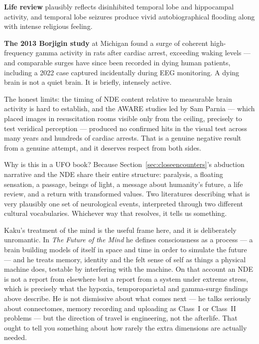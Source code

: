 \textbf{Life review} plausibly reflects disinhibited temporal lobe and hippocampal activity, and
temporal lobe seizures produce vivid autobiographical flooding along with intense religious
feeling.

\textbf{The 2013 Borjigin study} at Michigan found a surge of coherent high-frequency gamma
activity in rats after cardiac arrest, exceeding waking levels --- and comparable surges have
since been recorded in dying human patients, including a 2022 case captured incidentally during
EEG monitoring. A dying brain is not a quiet brain. It is briefly, intensely active.

The honest limits: the timing of NDE content relative to measurable brain activity is hard to
establish, and the AWARE studies led by Sam Parnia --- which placed images in resuscitation rooms
visible only from the ceiling, precisely to test veridical perception --- produced no confirmed
hits in the visual test across many years and hundreds of cardiac arrests. That is a genuine
negative result from a genuine attempt, and it deserves respect from both sides.

Why is this in a UFO book? Because Section~\ref{sec:closeencounters}'s abduction narrative and the NDE share their
entire structure: paralysis, a floating sensation, a passage, beings of light, a message about
humanity's future, a life review, and a return with transformed values. Two literatures
describing what is very plausibly one set of neurological events, interpreted through two
different cultural vocabularies. Whichever way that resolves, it tells us something.

Kaku's treatment of the mind is the useful frame here, and it is deliberately unromantic. In
\emph{The Future of the Mind} he defines consciousness as a process --- a brain building models of
itself in space and time in order to simulate the future --- and he treats memory, identity and
the felt sense of self as things a physical machine does, testable by interfering with the machine.
On that account an NDE is not a report from elsewhere but a report from a system under extreme
stress, which is precisely what the hypoxia, temporoparietal and gamma-surge findings above
describe. He is not dismissive about what comes next --- he talks seriously about connectomes,
memory recording and uploading as Class~I or Class~II problems --- but the direction of travel is
engineering, not the afterlife.  That
ought to tell you something about how rarely the extra dimensions are actually needed.


